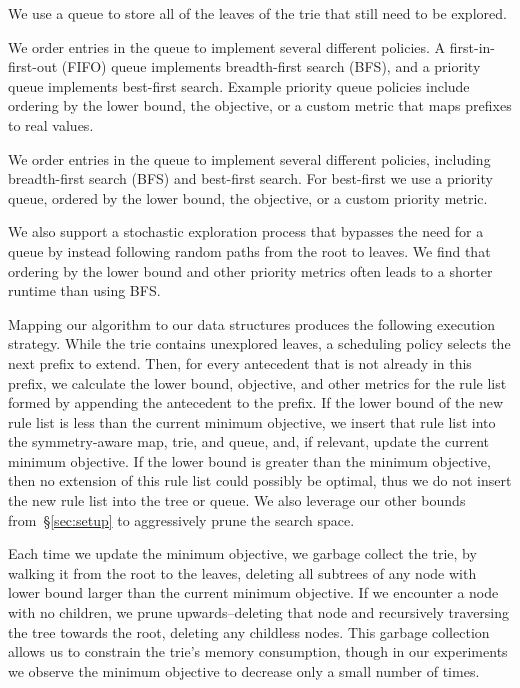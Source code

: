 We use a queue to store all of the leaves of the trie that still need to be explored.
%
\begin{arxiv}
We order entries in the queue to implement several different policies.
%
A first-in-first-out (FIFO) queue implements breadth-first search (BFS),
and a priority queue implements best-first search.
%
Example priority queue policies include ordering
by the lower bound, the objective, or a custom metric
that maps prefixes to real values.
\end{arxiv}
\begin{kdd}
We order entries in the queue to implement several different policies,
including breadth-first search (BFS) and best-first search.
%
For best-first we use a priority queue, ordered by the lower bound, the objective,
or a custom priority metric.
\end{kdd}
%
We also support a stochastic exploration process that bypasses
the need for a queue by instead following random paths from the root to leaves.
%
We find that ordering by the lower bound and other priority metrics
often leads to a shorter runtime than using BFS.


Mapping our algorithm to our data structures produces the following execution strategy.
%
While the trie contains unexplored leaves, a scheduling policy selects the next prefix to extend.
%
Then, for every antecedent that is not already in this prefix, we calculate the lower bound,
objective, and other metrics for the rule list formed by appending the antecedent to the prefix.
%
If the lower bound of the new rule list is less than the current minimum objective, we insert that
rule list into the symmetry-aware map, trie, and queue, and, if relevant, update the
current minimum objective.
%
If the lower bound is greater than the minimum objective,
then no extension of this rule list could possibly be optimal,
thus we do not insert the new rule list into the tree or queue.
%
We also leverage our other bounds from~\S\ref{sec:setup}
to aggressively prune the search space.

Each time we update the minimum objective, we garbage collect the trie, by walking it
from the root to the leaves, deleting all subtrees of any node with lower bound larger than the current
minimum objective. If we encounter a node with no children, we prune upwards--deleting that
node and recursively traversing the tree towards the root, deleting any childless nodes.
This garbage collection allows us to constrain the trie's memory consumption, though in our
experiments we observe the minimum objective to decrease only a small number of times.


